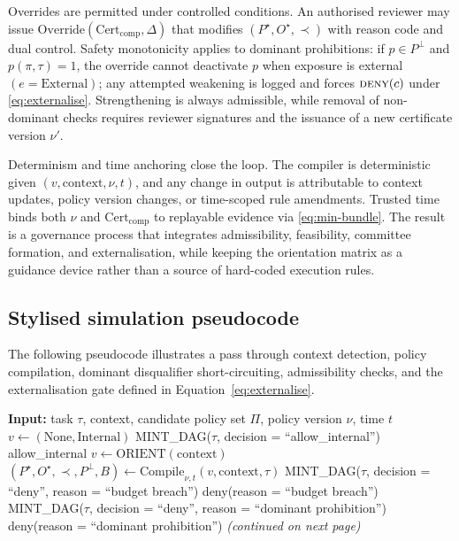 \documentclass[oneside,10pt]{swissi}
\begin{document}
Overrides are permitted under controlled conditions. An authorised reviewer may issue \(\mathrm{Override}(\mathrm{Cert}_{\mathrm{comp}},\Delta)\) that modifies \((P^{\star},O^{\star},\prec)\) with reason code and dual control. Safety monotonicity applies to dominant prohibitions: if \(p\in P^{\perp}\) and \(p(\pi,\tau)=1\), the override cannot deactivate \(p\) when exposure is external \((e=\text{External})\); any attempted weakening is logged and forces \(\textsc{deny}(c)\) under \eqref{eq:externalise}. Strengthening is always admissible, while removal of non-dominant checks requires reviewer signatures and the issuance of a new certificate version \(\nu'\).

Determinism and time anchoring close the loop. The compiler is deterministic given \((v,\text{context},\nu,t)\), and any change in output is attributable to context updates, policy version changes, or time-scoped rule amendments. Trusted time binds both \(\nu\) and \(\mathrm{Cert}_{\mathrm{comp}}\) to replayable evidence via \eqref{eq:min-bundle}. The result is a governance process that integrates admissibility, feasibility, committee formation, and externalisation, while keeping the orientation matrix as a guidance device rather than a source of hard-coded execution rules.

\subsection{Stylised simulation pseudocode}

The following pseudocode illustrates a pass through context detection, policy compilation, dominant disqualifier short-circuiting, admissibility checks, and the externalisation gate defined in Equation~\eqref{eq:externalise}.

\begin{algorithm}[H]
\caption{Execution flow for task $\tau$ (Part I)\protect\footnotemark}
\label{alg:task-execution-flow-part1}
\begin{algorithmic}[1]
\State \textbf{Input:} task $\tau$, context, candidate policy set $\Pi$, policy version $\nu$, time $t$
    \State $v \gets (\text{None}, \text{Internal})$
    \State MINT\_DAG($\tau$, decision = ``allow\_internal'')
    \State \Return allow\_internal
\Else
    \State $v \gets \text{ORIENT}(\text{context})$
    \State $(P^\star, O^\star, \prec, P^\bot, B) \gets \text{Compile}_{\nu,t}(v, \text{context}, \tau)$
        \State MINT\_DAG($\tau$, decision = ``deny'', reason = ``budget breach'')
        \State \Return deny(reason = ``budget breach'')
    \EndIf
            \State MINT\_DAG($\tau$, decision = ``deny'', reason = ``dominant prohibition'')
            \State \Return deny(reason = ``dominant prohibition'')
        \EndIf
    \EndFor
\EndIf
\Statex \hfill\textit{(continued on next page)}
\end{algorithmic}
\end{algorithm}
\end{document}
